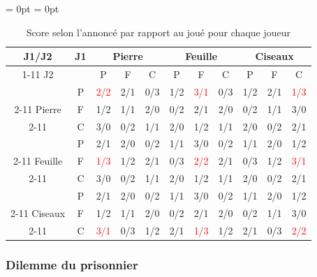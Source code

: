 \documentclass{article}
\begin{document}
    \begin{table}[H]
    \renewcommand{\arraystretch}{2}%
    \centering
    \aboverulesep = 0pt
    \belowrulesep = 0pt
        \begin{tabular}{|c|c||c|c|c||c|c|c||c|c|c|}
            \toprule
            J1/J2  & J1 &  \multicolumn{3}{|c||}{Pierre} & \multicolumn{3}{c||}{Feuille} & \multicolumn{3}{c|}{Ciseaux}   \\ 
            \cmidrule{1-11}
              J2   &   & P &   F    & C & P &    F    & C & P &    F    & C \\ \midrule \midrule
                  & P &\textcolor{red}{2/2}&  2/1   & 0/3 & 1/2 &  \textcolor{red}{3/1}  & 0/3 & 1/2 &   2/1   &\textcolor{red}{1/3}\\ 
            \cmidrule{2-11}
             Pierre & F & 1/2 &  1/1   & 2/0 & 0/2 &   2/1   & 2/0 & 0/2 &   1/1   & 3/0 \\ 
            \cmidrule{2-11}
                   & C & 3/0 &  0/2   & 1/1 & 2/0 &   1/2   & 1/1 & 2/0 &   0/2   & 2/1 \\ \midrule \midrule
                   & P & 2/1 &  2/0   & 0/2 & 1/1 &   3/0   & 0/2 & 1/1 &   2/0   & 1/2 \\ 
            \cmidrule{2-11}
            Feuille& F &\textcolor{red}{1/3}&  1/2   & 2/1 & 0/3 &  \textcolor{red}{2/2}  & 2/1 & 0/3 &   1/2   &\textcolor{red}{3/1}\\ 
            \cmidrule{2-11}
                   & C & 3/0 &  0/2   & 1/1 & 2/0 &   1/2   & 1/1 & 2/0 &   0/2   & 2/1 \\ \midrule \midrule
                   & P & 2/1 &  2/0   & 0/2 & 1/1 &   3/0   & 0/2 & 1/1 &   2/0   & 1/2 \\ 
            \cmidrule(l){2-11}
            Ciseaux& F & 1/2 &  1/1   & 2/0 & 0/2 &   2/1   & 2/0 & 0/2 &   1/1   & 3/0\\ 
            \cmidrule{2-11}
                   & C &\textcolor{red}{3/1}& 0/3  & 1/2 & 2/1 &  \textcolor{red}{1/3}  & 1/2 & 2/1 &  0/3  &\textcolor{red}{2/2}\\ \bottomrule
        \end{tabular}
        \caption{Score selon l'annoncé par rapport au joué pour chaque joueur}
    \end{table}

\subsubsection{Dilemme du prisonnier}
\end{document}
